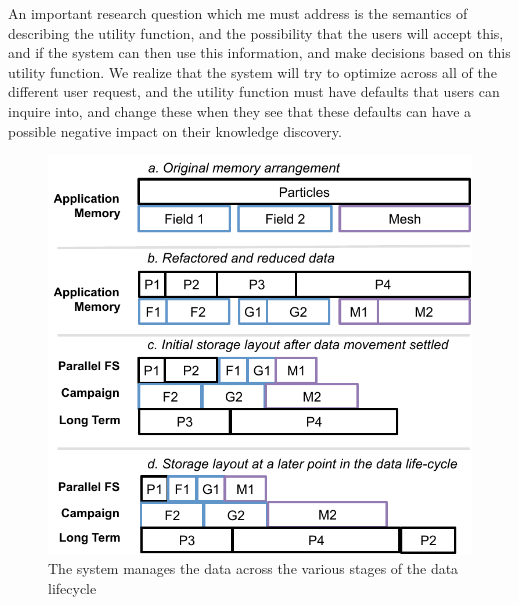An important research question which me must address is the semantics of
describing the utility function, and the possibility that the users will
accept this, and if the system can then use this information, and make 
decisions based on this utility function. We realize that the system will
try to optimize across all of the different user request, and the utility
function must have defaults that users can inquire into, and change these
when they see that these defaults can have a possible negative impact on
their knowledge discovery. 

\begin{figure}
        \vspace{-6ex}
        \begin{centering} 
	\includegraphics[scale=0.8]{graphics/SSIO-bucket.pdf}
        \caption{The system manages the data across the various stages of the data lifecycle}
        \label{fig:ssio-bucket}
        \end{centering}
\end{figure}


